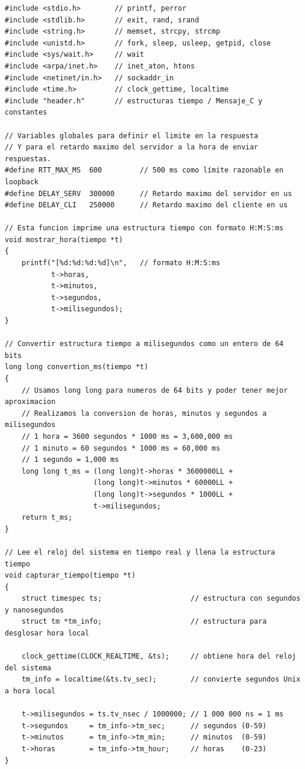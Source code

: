 \begin{lstlisting}[style=estiloC]
#include <stdio.h>        // printf, perror
#include <stdlib.h>       // exit, rand, srand
#include <string.h>       // memset, strcpy, strcmp
#include <unistd.h>       // fork, sleep, usleep, getpid, close
#include <sys/wait.h>     // wait
#include <arpa/inet.h>    // inet_aton, htons
#include <netinet/in.h>   // sockaddr_in
#include <time.h>         // clock_gettime, localtime
#include "header.h"       // estructuras tiempo / Mensaje_C y constantes

// Variables globales para definir el limite en la respuesta
// Y para el retardo maximo del servidor a la hora de enviar respuestas.
#define RTT_MAX_MS  600         // 500 ms como límite razonable en loopback
#define DELAY_SERV  300000      // Retardo maximo del servidor en us
#define DELAY_CLI   250000      // Retardo maximo del cliente en us

// Esta funcion imprime una estructura tiempo con formato H:M:S:ms
void mostrar_hora(tiempo *t)
{
    printf("[%d:%d:%d:%d]\n",   // formato H:M:S:ms
           t->horas,
           t->minutos,
           t->segundos,
           t->milisegundos);
}

// Convertir estructura tiempo a milisegundos como un entero de 64 bits
long long convertion_ms(tiempo *t)
{
    // Usamos long long para numeros de 64 bits y poder tener mejor aproximacion
    // Realizamos la conversion de horas, minutos y segundos a milisegundos
    // 1 hora = 3600 segundos * 1000 ms = 3,600,000 ms
    // 1 minuto = 60 segundos * 1000 ms = 60,000 ms
    // 1 segundo = 1,000 ms
    long long t_ms = (long long)t->horas * 3600000LL +
                     (long long)t->minutos * 60000LL +
                     (long long)t->segundos * 1000LL +
                     t->milisegundos;
    return t_ms;
}

// Lee el reloj del sistema en tiempo real y llena la estructura tiempo
void capturar_tiempo(tiempo *t)
{
    struct timespec ts;                     // estructura con segundos y nanosegundos
    struct tm *tm_info;                     // estructura para desglosar hora local

    clock_gettime(CLOCK_REALTIME, &ts);     // obtiene hora del reloj del sistema
    tm_info = localtime(&ts.tv_sec);        // convierte segundos Unix a hora local

    t->milisegundos = ts.tv_nsec / 1000000; // 1 000 000 ns = 1 ms
    t->segundos     = tm_info->tm_sec;      // segundos (0-59)
    t->minutos      = tm_info->tm_min;      // minutos  (0-59)
    t->horas        = tm_info->tm_hour;     // horas    (0-23)
}


\end{lstlisting}

